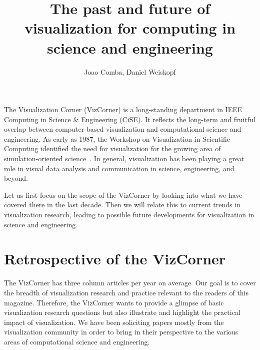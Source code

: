 \documentclass[10pt,journal,compsoc]{IEEEtran}
\begin{document}
\title{The past and future of visualization for computing in science and engineering}



\author{%
	Joao Comba, Daniel Weiskopf
	}




\maketitle


The Visualization Corner (VizCorner) is a long-standing department in IEEE Computing in Science \& Engineering (CiSE). It reflects the long-term and fruitful overlap between computer-based visualization and computational science and engineering. As early as 1987, the Workshop on Visualization in Scientific Computing identified the need for visualization for the growing area of simulation-oriented science~\cite{NSFreport1987}. In general, visualization has been playing a great role in visual data analysis and communication in science, engineering, and beyond. 

Let us first focus on the scope of the VizCorner by looking into what we have covered there in the last decade. Then we will relate this to current trends in visualization research, leading to possible future developments for visualization in science and engineering.



\section{Retrospective of the VizCorner}

The VizCorner has three column articles per year on average. Our goal is to cover the breadth of visualization research and practice relevant to the readers of this magazine. Therefore, the VizCorner wants to provide a glimpse of basic visualization research questions but also illustrate and highlight the practical impact of visualization. We have been soliciting papers mostly from the visualization community in order to bring in their perspective to the various areas of computational science and engineering.
\end{document}
